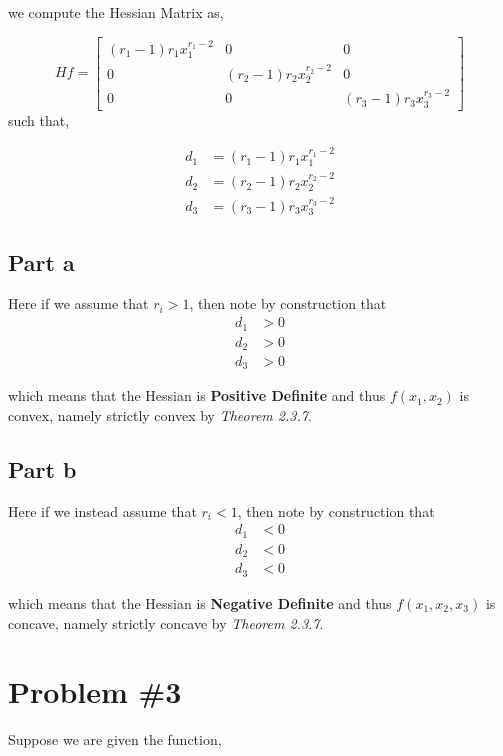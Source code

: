\documentclass{article}
\begin{document}
we compute the Hessian Matrix as,

\begin{equation*}
    Hf = \begin{bmatrix*}
        (r_1-1)r_1x_1^{r_1-2} & 0 & 0 \\
        0 & (r_2-1)r_2x_2^{r_2-2} & 0 \\
        0 & 0 & (r_3-1)r_3x_3^{r_3-2}
    \end{bmatrix*}
\end{equation*}
such that,

\begin{align*}
    d_1 &= (r_1-1)r_1x_1^{r_1-2} \\
    d_2 &= (r_2-1)r_2x_2^{r_2-2}\\
    d_3 &= (r_3-1)r_3x_3^{r_3-2}
\end{align*}

\subsection*{Part a}
Here if we assume that $r_i > 1$, then note by construction that
\begin{align*}
    d_1 &> 0 \\
    d_2 &> 0 \\
    d_3 &> 0 
\end{align*}

which means that the Hessian is \textbf{Positive Definite} and thus $f(x_1,x_2)$ is convex, namely strictly convex by \textit{Theorem 2.3.7}.

\subsection*{Part b}

Here if we instead assume that 
$r_i < 1$, then note by construction that
\begin{align*}
    d_1 &< 0 \\
    d_2 &< 0 \\
    d_3 &< 0 
\end{align*}

which means that the Hessian is \textbf{Negative Definite} and thus $f(x_1,x_2,x_3)$ is concave, namely strictly concave by \textit{Theorem 2.3.7}.

\section*{Problem \#3}

Suppose we are given the function,
\end{document}
